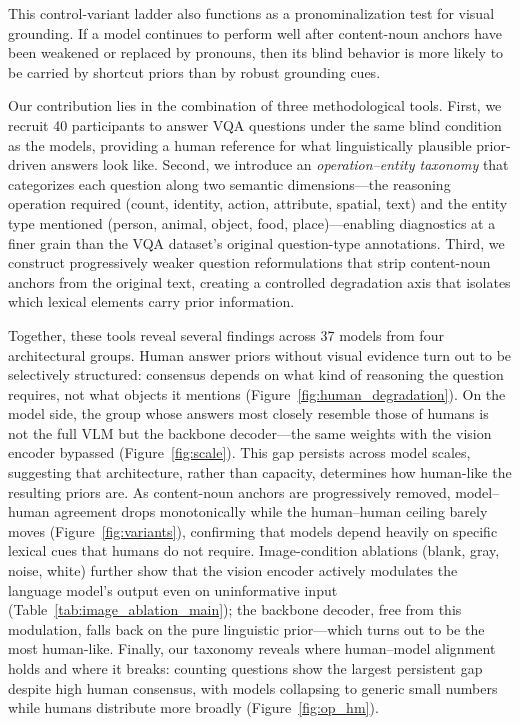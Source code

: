 \documentclass[letterpaper]{article}
\begin{document}
This control-variant ladder also functions as a pronominalization test for
visual grounding. If a model continues to perform well after content-noun
anchors have been weakened or replaced by pronouns, then its blind behavior is
more likely to be carried by shortcut priors than by robust grounding cues.

Our contribution lies in the combination of three methodological tools.
First, we recruit 40 participants to answer VQA
questions under the same blind condition as the models, providing a human
reference for what linguistically plausible prior-driven answers look like.
Second, we introduce an \emph{operation--entity taxonomy} that categorizes
each question along two semantic dimensions---the reasoning operation
required (count, identity, action, attribute, spatial, text) and the entity
type mentioned (person, animal, object, food, place)---enabling diagnostics
at a finer grain than the VQA dataset's original question-type annotations.
Third, we construct progressively weaker question reformulations that strip
content-noun anchors from the original text, creating a controlled
degradation axis that isolates which lexical elements carry prior information.

Together, these tools reveal several findings across 37 models from four
architectural groups. Human answer priors without visual evidence turn out
to be selectively structured: consensus depends on what kind of reasoning
the question requires, not what objects it mentions
(Figure~\ref{fig:human_degradation}). On the model side, the group whose
answers most closely resemble those of humans is not the full VLM but the
backbone decoder---the same weights with the vision encoder bypassed
(Figure~\ref{fig:scale}). This gap persists across model scales, suggesting
that architecture, rather than capacity, determines how human-like the
resulting priors are. As content-noun anchors are progressively removed,
model--human agreement drops monotonically while the human--human ceiling
barely moves (Figure~\ref{fig:variants}), confirming that models depend
heavily on specific lexical cues that humans do not require.
Image-condition ablations (blank, gray, noise, white) further show that the
vision encoder actively modulates the language model's output even on
uninformative input (Table~\ref{tab:image_ablation_main}); the backbone
decoder, free from this modulation, falls back on the pure linguistic
prior---which turns out to be the most human-like. Finally, our taxonomy
reveals where human--model alignment holds and where it breaks: counting
questions show the largest persistent gap despite high human consensus,
with models collapsing to generic small numbers while humans distribute
more broadly (Figure~\ref{fig:op_hm}).
\end{document}
